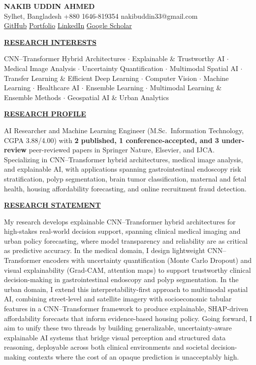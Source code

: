 \documentclass[10pt,letterpaper]{article}
\newcommand{\sectiontitle}[1]{\vspace{3pt}\noindent\underline{\textbf{#1}}\vspace{2pt}\par}
\begin{document}
\begin{center}
  {\large \bfseries NAKIB UDDIN AHMED} \\[2pt]
  Sylhet, Bangladesh \quad \textbar \quad +880 1646-819354 \quad \textbar \quad nakibuddin33@gmail.com \\[1pt]
  \href{https://github.com/nakib33}{GitHub} \quad \textbar \quad \href{https://nakib-uddin-ahmed33.netlify.app/}{Portfolio} \quad \textbar \quad \href{https://www.linkedin.com/in/nakib33/}{LinkedIn} \quad \textbar \quad \href{https://scholar.google.com/citations?hl=en&user=NYlbPAwAAAAJ}{Google Scholar}
\end{center}

\sectiontitle{RESEARCH INTERESTS}
CNN--Transformer Hybrid Architectures $\cdot$ Explainable \& Trustworthy AI $\cdot$ Medical Image Analysis $\cdot$ Uncertainty Quantification $\cdot$ Multimodal Spatial AI $\cdot$ Transfer Learning \& Efficient Deep Learning $\cdot$ Computer Vision $\cdot$ Machine Learning $\cdot$ Healthcare AI $\cdot$ Ensemble Learning $\cdot$ Multimodal Learning \& Ensemble Methods $\cdot$ Geospatial AI \& Urban Analytics

\sectiontitle{RESEARCH PROFILE}
AI Researcher and Machine Learning Engineer (M.Sc.\ Information Technology, CGPA 3.88/4.00) with \textbf{2 published, 1 conference-accepted, and 3 under-review} peer-reviewed papers in Springer Nature, Elsevier, and IJCA. Specializing in CNN--Transformer hybrid architectures, medical image analysis, and explainable AI, with applications spanning gastrointestinal endoscopy risk stratification, polyp segmentation, brain tumor classification, maternal and fetal health, housing affordability forecasting, and online recruitment fraud detection.

\sectiontitle{RESEARCH STATEMENT}
My research develops explainable CNN--Transformer hybrid architectures for high-stakes real-world decision support, spanning clinical medical imaging and urban policy forecasting, where model transparency and reliability are as critical as predictive accuracy. In the medical domain, I design lightweight CNN--Transformer encoders with uncertainty quantification (Monte Carlo Dropout) and visual explainability (Grad-CAM, attention maps) to support trustworthy clinical decision-making in gastrointestinal endoscopy and polyp segmentation. In the urban domain, I extend this interpretability-first approach to multimodal spatial AI, combining street-level and satellite imagery with socioeconomic tabular features in a CNN--Transformer framework to produce explainable, SHAP-driven affordability forecasts that inform evidence-based housing policy. Going forward, I aim to unify these two threads by building generalizable, uncertainty-aware explainable AI systems that bridge visual perception and structured data reasoning, deployable across both clinical environments and societal decision-making contexts where the cost of an opaque prediction is unacceptably high.
\end{document}
